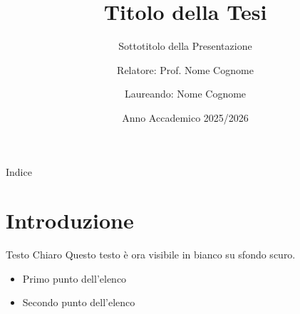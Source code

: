 \documentclass[aspectratio=169]{beamer}
\title[Titolo Breve]{Titolo della Tesi}
\subtitle{Sottotitolo della Presentazione}
\author[Nome Cognome]{Relatore: Prof. Nome Cognome \and Laureando: Nome Cognome}
\date{Anno Accademico 2025/2026}
\begin{document}
\begin{frame}
    \titlepage
\end{frame}

\begin{frame}{Indice}
    \tableofcontents
\end{frame}

\section{Introduzione}
\begin{frame}{Testo Chiaro}
    Questo testo è ora visibile in bianco su sfondo scuro.
    \begin{itemize}
        \item Primo punto dell'elenco
        \item Secondo punto dell'elenco
    \end{itemize}
\end{frame}
\end{document}
